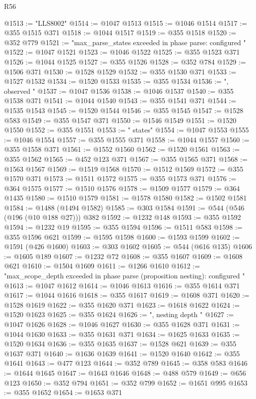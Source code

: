 \begin{lexlean}{R56}
\begin{coremodule}
@1513 := "LLS8002"
@1514 := @1047 @1513
@1515 := @1046 @1514
@1517 := @355 @1515 @371
@1518 := @1044 @1517
@1519 := @355 @1518
@1520 := @352 @779
@1521 := "max_parse_states exceeded in phase parse: configured "
@1522 := @1047 @1521
@1523 := @1046 @1522
@1525 := @355 @1523 @371
@1526 := @1044 @1525
@1527 := @355 @1526
@1528 := @352 @784
@1529 := @1506 @371
@1530 := @1528 @1529
@1532 := @355 @1530 @371
@1533 := @1527 @1532
@1534 := @1520 @1533
@1535 := @355 @1534
@1536 := ", observed "
@1537 := @1047 @1536
@1538 := @1046 @1537
@1540 := @355 @1538 @371
@1541 := @1044 @1540
@1543 := @355 @1541 @371
@1544 := @1535 @1543
@1545 := @1520 @1544
@1546 := @355 @1545
@1547 := @1528 @583
@1549 := @355 @1547 @371
@1550 := @1546 @1549
@1551 := @1520 @1550
@1552 := @355 @1551
@1553 := " states"
@1554 := @1047 @1553
@1555 := @1046 @1554
@1557 := @355 @1555 @371
@1558 := @1044 @1557
@1560 := @355 @1558 @371
@1561 := @1552 @1560
@1562 := @1520 @1561
@1563 := @355 @1562
@1565 := @452 @123 @371
@1567 := @355 @1565 @371
@1568 := @1563 @1567
@1569 := @1519 @1568
@1570 := @1512 @1569
@1572 := @355 @1570 @371
@1573 := @1511 @1572
@1575 := @355 @1573 @371
@1576 := @364 @1575
@1577 := @1510 @1576
@1578 := @1509 @1577
@1579 := @364 @1435
@1580 := @1510 @1579
@1581 := @1578 @1580
@1582 := @1502 @1581
@1584 := @1488 (@1494 @1582)
@1585 := @303 @1584
@1591 := @544 (@546 (@196 (@10 @188 @27))) @382
@1592 := @1232 @148
@1593 := @355 @1592
@1594 := @1232 @19
@1595 := @355 @1594
@1596 := @1511 @583
@1598 := @355 @1596 @621
@1599 := @1595 @1598
@1600 := @1593 @1599
@1602 := @1591 (@426 @1600)
@1603 := @303 @1602
@1605 := @544 (@616 @135)
@1606 := @1605 @189
@1607 := @1232 @72
@1608 := @355 @1607
@1609 := @1608 @621
@1610 := @1504 @1609
@1611 := @1266 @1610
@1612 := "max_scope_depth exceeded in phase parse (proposition nesting): configured "
@1613 := @1047 @1612
@1614 := @1046 @1613
@1616 := @355 @1614 @371
@1617 := @1044 @1616
@1618 := @355 @1617
@1619 := @1608 @371
@1620 := @1528 @1619
@1622 := @355 @1620 @371
@1623 := @1618 @1622
@1624 := @1520 @1623
@1625 := @355 @1624
@1626 := ", nesting depth "
@1627 := @1047 @1626
@1628 := @1046 @1627
@1630 := @355 @1628 @371
@1631 := @1044 @1630
@1633 := @355 @1631 @371
@1634 := @1625 @1633
@1635 := @1520 @1634
@1636 := @355 @1635
@1637 := @1528 @621
@1639 := @355 @1637 @371
@1640 := @1636 @1639
@1641 := @1520 @1640
@1642 := @355 @1641
@1643 := @477 @123
@1644 := @352 @789
@1645 := @358 @583
@1646 := @1644 @1645
@1647 := @1643 @1646
@1648 := @488 @579
@1649 := @656 @123
@1650 := @352 @794
@1651 := @352 @799
@1652 := @1651 @995
@1653 := @355 @1652
@1654 := @1653 @371

\end{coremodule}
\end{lexlean}
